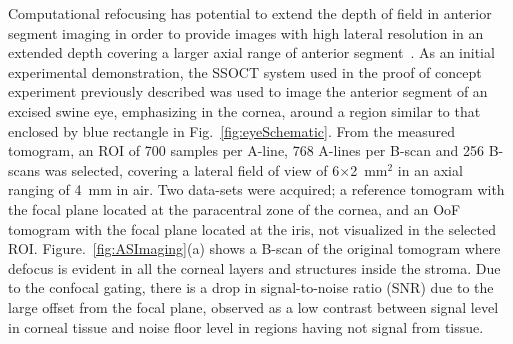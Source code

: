 Computational refocusing has potential to extend the depth of field in anterior segment imaging in order to provide images with high lateral resolution in an extended depth covering a larger axial range of anterior segment~\cite{Wang2019_Cellular}. As an initial experimental demonstration, the SSOCT system used in the proof of concept experiment previously described was used to image the anterior segment of an excised swine eye, emphasizing in the cornea, around a region similar to that enclosed by blue rectangle in Fig.~\ref{fig:eyeSchematic}. From the measured tomogram, an ROI of 700 samples per A-line, 768 A-lines per B-scan and 256 B-scans was selected, covering a lateral field of view of 6$\times$2~mm$^2$ in an axial ranging of 4~mm in air. Two data-sets were acquired; a reference tomogram with the focal plane located at the paracentral zone of the cornea, and an OoF tomogram with the focal plane located at the iris, not visualized in the selected ROI. Figure.~\ref{fig:ASImaging}(a) shows a B-scan of the original tomogram where defocus is evident in all the corneal layers and structures inside the stroma. Due to the confocal gating, there is a drop in signal-to-noise ratio (SNR) due to the large offset from the focal plane, observed as a low contrast between signal level in corneal tissue and noise floor level in regions having not signal from tissue.

